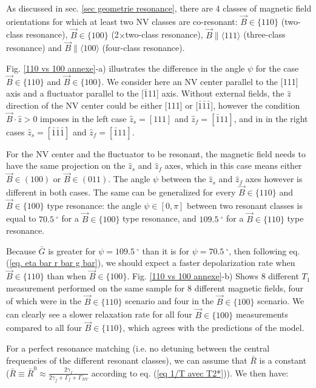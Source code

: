 \documentclass[a4paper, 11pt]{report}
\begin{document}
As discussed in sec. \ref{sec geometrie resonance}, there are 4 classes of magnetic field orientations for which at least two NV classes are co-resonant: $\vec{B} \in \{110\}$ (two-class resonance), $\vec{B} \in \{100\}$ (2$\times$two-class resonance), $\vec{B} \parallel \langle 111 \rangle$ (three-class resonance) and $\vec{B} \parallel \langle 100\rangle$ (four-class resonance).

Fig. \ref{110 vs 100 annexe}-a) illustrates the difference in the angle $\psi$ for the case $\vec{B} \in \{110\}$ and $\vec{B} \in \{100\}$. We consider here an NV center parallel to the [111] axis and a fluctuator parallel to the [$\bar 1$11] axis. Without external fields, the $\hat z$ direction of the NV center could be either [111] or [$\bar 1 \bar 1 \bar 1$], however the condition $\vec{B}\cdot\hat{z} >0$ imposes in the left case $\hat z_s=[111]$ and $\hat z_f=[\bar 1 11]$, and in in the right cases $\hat z_s=[\bar 1 \bar 1 \bar 1]$ and $\hat z_f=[\bar 1 11]$. 

For the NV center and the fluctuator to be resonant, the magnetic field needs to have the same projection on the $\hat z_s$ and $\hat z_f$ axes, which in this case means either $\vec{B} \in (100)$ or $\vec{B} \in (011)$. The angle $\psi$ between the $\hat z_s$ and $\hat z_f$ axes however is different in both cases. The same can be generalized for every $\vec{B} \in \{110\}$ and $\vec{B} \in \{100\}$ type resonance: the angle $\psi \in [0,\pi]$ between two resonant classes is equal to $70.5 \ ^\circ$ for a $\vec{B} \in \{100\}$ type resonance, and $109.5 \ ^\circ$ for a $\vec{B} \in \{110\}$ type resonance.

Because $\bar G$ is greater for $\psi=109.5 \ ^\circ$ than it is for $\psi=70.5 \ ^\circ$, then following eq. (\ref{eq. eta bar r bar g bar}), we should expect a faster depolarization rate when $\vec{B} \in \{110\}$ than when $\vec{B} \in \{100\}$. Fig. \ref{110 vs 100 annexe}-b) Shows 8 different $T_1$ measurement performed on the same sample for 8 different magnetic fields, four of which were in the $\vec{B} \in \{110\}$ scenario and four in the $\vec{B} \in \{100\}$ scenario. We can clearly see a slower relaxation rate for all four $\vec{B} \in \{100\}$ measurements compared to all four $\vec{B} \in \{110\}$, which agrees with the predictions of the model.

For a perfect resonance matching (i.e. no detuning between the central frequencies of the different resonant classes), we can assume that $\bar R$ is a constant ($\bar R \equiv \bar R^0 \approx \frac{2 \gamma_f}{2 \gamma_f + \Gamma_f + \Gamma_{NV}}$ according to eq. (\ref{eq 1/T avec T2*})). We then have:
\end{document}
